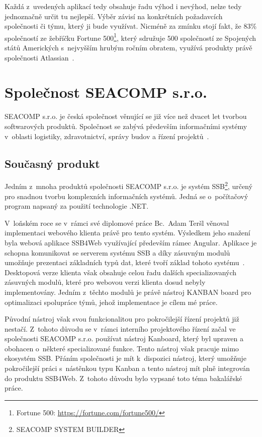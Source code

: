 Každá z~uvedených aplikací tedy obsahuje řadu výhod i nevýhod, nelze tedy jednoznačně určit tu nejlepší. Výběr závisí na konkrétních požadavcích společnosti či týmu, který ji bude využívat. Nicméně za zmínku stojí fakt, že 83\% společností ze žebříčku Fortune 500\footnote{Fortune 500: \url{https://fortune.com/fortune500/}}, který sdružuje 500 společností ze Spojených států Amerických s~nejvyšším hrubým ročním obratem, využívá produkty právě společnosti Atlassian~\cite{bib:atlassian-customers}.



\section{Společnost SEACOMP s.r.o.}
SEACOMP s.r.o. je česká společnost věnující se již více než dvacet let tvorbou softwarových produktů. Společnost se zabývá především informačními systémy v~oblasti logistiky, zdravotnictví, správy budov a řízení projektů~\cite{bib:seacomp-portfolio}.


\subsection{Současný produkt}
Jedním z~mnoha produktů společnosti SEACOMP s.r.o. je systém SSB\footnote{SEACOMP SYSTEM BUILDER}, určený pro snadnou tvorbu komplexních informačních systémů. Jedná se o~počítačový program napsaný za použití technologie .NET.

V~loňském roce se v~rámci své diplomové práce Bc.~Adam Teršl věnoval implementaci webového klienta právě pro tento systém. Výsledkem jeho snažení byla webová aplikace SSB4Web využívající především rámec Angular. Aplikace je schopna komunikovat se serverem systému SSB a díky zásuvným modulů umožňuje prezentaci základních typů dat, které tvoří základ tohoto systému~\cite{bib:tersl}. Desktopová verze klienta však obsahuje celou řadu dalších specializovaných zásuvných modulů, které pro webovou verzi klienta dosud nebyly implementovány. Jedním z~těchto modulů je právě nástroj KANBAN board pro optimalizaci spolupráce týmů, jehož implementace je cílem mé práce. 

Původní nástroj však svou funkcionalitou pro pokročilejší řízení projektů již nestačí. Z~tohoto důvodu se v~rámci interního projektového řízení začal ve společnosti SEACOMP s.r.o. používat nástroj Kanboard, který byl upraven a obohacen o~některé specializované funkce. Tento nástroj však pracuje mimo ekosystém SSB. Přáním společnosti je mít k~dispozici nástroj, který umožňuje pokročilejší práci s~nástěnkou typu Kanban a tento nástroj mít plně integrován do produktu SSB4Web. Z~tohoto důvodu bylo vypsané toto téma bakalářské práce.


